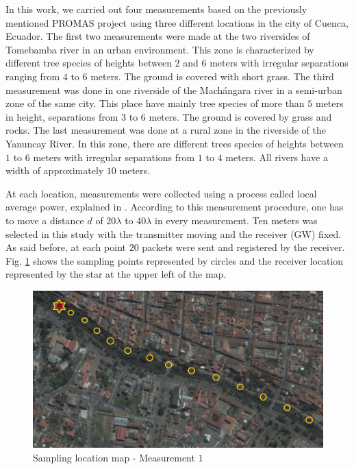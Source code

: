 In this work, we carried out four measurements based on the previously mentioned PROMAS project using three different locations in the city of Cuenca, Ecuador. The first two measurements were made at the two riversides of Tomebamba river in an urban environment. This zone is characterized by different tree species of heights between $2$ and $6$ meters with irregular separations ranging from $4$ to $6$ meters. The ground is covered with short grass. 
The third measurement was done in one riverside of the Machángara river in a semi-urban zone of the same city. This place have mainly tree species of more than $5$ meters in height, separations from $3$ to $6$ meters. The ground is covered by grass and rocks. The last measurement was done at a rural zone in the riverside of the Yanuncay River. In this zone, there are different trees species of heights between $1$ to $6$ meters with irregular separations from $1$ to $4$ meters. All rivers have a width of approximately $10$ meters.

At each location, measurements were collected using a process called local average power, explained in \cite{Lee1985}. According to this measurement procedure, one has to move a distance $d$ of $20\lambda$ to $40\lambda$ in every measurement. Ten meters was selected in this study with the transmitter moving and the receiver (GW) fixed. As said before, at each point $20$ packets were sent and registered by the receiver. Fig. \ref{fig:locationmap} shows the sampling points represented by circles and the receiver location represented by the star at the upper left of the map.

\begin{figure}[!htb]
  \centering
  \includegraphics[width=1\columnwidth]{map}
  \caption{Sampling location map - Measurement $1$}
  \label{fig:locationmap}
\end{figure}

